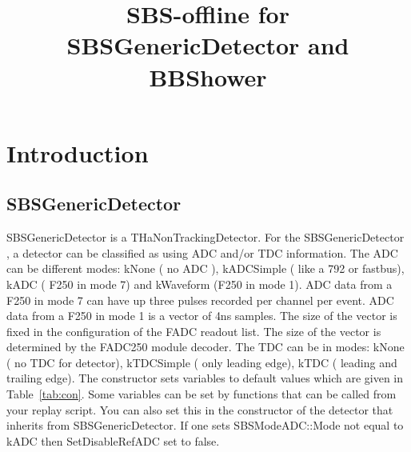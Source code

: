 \documentclass[11pt]{article}
\begin{document}
\title{SBS-offline for SBSGenericDetector  and BBShower}
\maketitle

\section{Introduction}

\subsection{SBSGenericDetector}
SBSGenericDetector is a THaNonTrackingDetector.
For the SBSGenericDetector , a detector can be classified as using ADC and/or TDC information.
The ADC can be different modes: kNone ( no ADC ), kADCSimple ( like a 792 or fastbus), kADC ( F250 in mode 7)
and kWaveform (F250 in mode 1). ADC data from a F250 in mode 7 can have up three pulses recorded
per channel per event. ADC data from a F250 in mode 1 is a vector of 4ns samples. The size of the vector is fixed in the configuration of the FADC readout list.  The size of the vector is determined by
the FADC250 module decoder. 
The TDC can be in modes: kNone ( no TDC for detector), kTDCSimple ( only leading edge), kTDC ( leading and trailing edge). 
The constructor sets variables to default values which are given in Table~\ref{tab:con}. Some variables can be set by functions that can be called from your replay script. 
You can also set this in the constructor of the detector that inherits from SBSGenericDetector. 
If one sets SBSModeADC::Mode not equal to kADC then SetDisableRefADC set to false.
\end{document}
